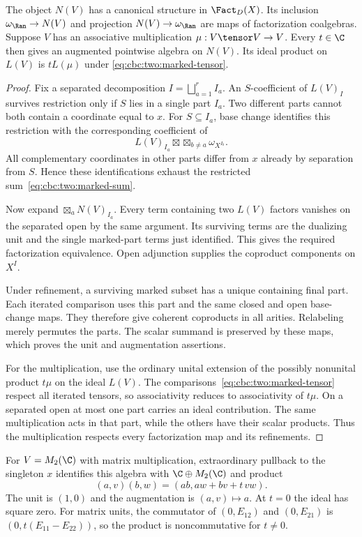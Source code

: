 \begin{proposition}
\label{cbc:two:factorization}
The object $N(V)$ has a canonical structure in $\Fact_D(X)$.
Its inclusion $\omega_{\Ran}\to N(V)$ and projection
$N(V)\to\omega_{\Ran}$ are maps of factorization coalgebras.
Suppose $V$ has an associative multiplication $\mu:V\tensor V\to V$.
Every $t\in\C$ then gives an augmented pointwise algebra on $N(V)$.
Its ideal product on $L(V)$ is $tL(\mu)$ under
\eqref{eq:cbc:two:marked-tensor}.
\end{proposition}
\begin{proof}
Fix a separated decomposition $I=\bigsqcup_{a=1}^r I_a$.
An $S$-coefficient of $L(V)_I$ survives restriction only if $S$
lies in a single part $I_a$.
Two different parts cannot both contain a coordinate equal to $x$.
For $S\subseteq I_a$, base change identifies this restriction with
the corresponding coefficient of
\[
 L(V)_{I_a}\boxtimes\mathop{\boxtimes}_{b\ne a}\omega_{X^{I_b}}.
\]
All complementary coordinates in other parts differ from $x$ already
by separation from $S$. Hence these identifications exhaust the
restricted sum~\eqref{eq:cbc:two:marked-sum}.

Now expand $\boxtimes_a N(V)_{I_a}$.
Every term containing two $L(V)$ factors vanishes on the separated
open by the same argument. Its surviving terms are the dualizing
unit and the single marked-part terms just identified.
This gives the required factorization equivalence.
Open adjunction supplies the coproduct components on $X^I$.

Under refinement, a surviving marked subset has a unique containing
final part. Each iterated comparison uses this part and the same
closed and open base-change maps.
They therefore give coherent coproducts in all arities.
Relabeling merely permutes the parts. The scalar summand is preserved
by these maps, which proves the unit and augmentation assertions.

For the multiplication, use the ordinary unital extension of the
possibly nonunital product $t\mu$ on the ideal $L(V)$.
The comparisons~\eqref{eq:cbc:two:marked-tensor} respect all iterated
tensors, so associativity reduces to associativity of $t\mu$.
On a separated open at most one part carries an ideal contribution.
The same multiplication acts in that part, while the others have
their scalar products. Thus the multiplication respects every
factorization map and its refinements.
\end{proof}

For $V=M_2(\C)$ with matrix multiplication, extraordinary pullback
to the singleton $x$ identifies this algebra with $\C\oplus M_2(\C)$
and product
\begin{equation}
 (a,v)(b,w)=(ab,aw+bv+t\,vw).
 \label{eq:cbc:two:matrix}
\end{equation}
The unit is $(1,0)$ and the augmentation is $(a,v)\mapsto a$.
At $t=0$ the ideal has square zero.
For matrix units, the commutator of $(0,E_{12})$ and $(0,E_{21})$
is $(0,t(E_{11}-E_{22}))$, so the product is noncommutative for $t\ne0$.

